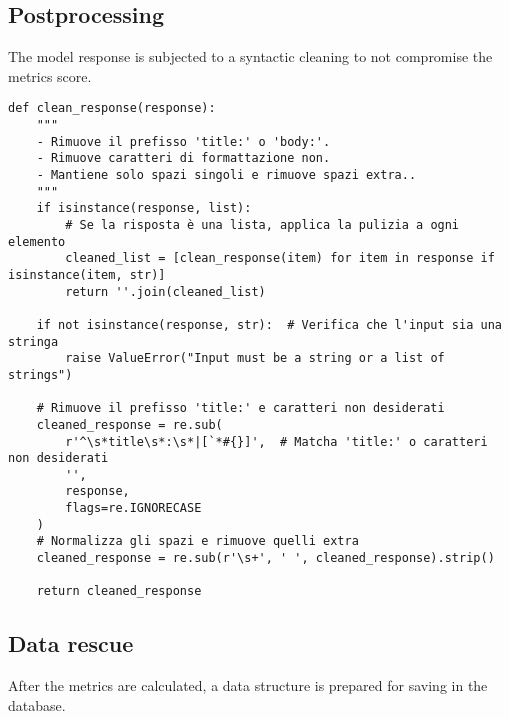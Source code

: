 \subsection{Postprocessing}
The model response is subjected to a syntactic cleaning to not compromise the metrics score.
\begin{verbatim}
def clean_response(response):
    """
    - Rimuove il prefisso 'title:' o 'body:'.
    - Rimuove caratteri di formattazione non.
    - Mantiene solo spazi singoli e rimuove spazi extra..
    """
    if isinstance(response, list):
        # Se la risposta è una lista, applica la pulizia a ogni elemento
        cleaned_list = [clean_response(item) for item in response if isinstance(item, str)]
        return ''.join(cleaned_list)

    if not isinstance(response, str):  # Verifica che l'input sia una stringa
        raise ValueError("Input must be a string or a list of strings")

    # Rimuove il prefisso 'title:' e caratteri non desiderati
    cleaned_response = re.sub(
        r'^\s*title\s*:\s*|[`*#{}]',  # Matcha 'title:' o caratteri non desiderati
        '',
        response,
        flags=re.IGNORECASE
    )
    # Normalizza gli spazi e rimuove quelli extra
    cleaned_response = re.sub(r'\s+', ' ', cleaned_response).strip()

    return cleaned_response
\end{verbatim}

\subsection{Data rescue}
After the metrics are calculated, a data structure is prepared for saving in the database.

